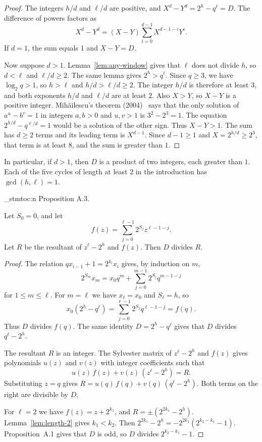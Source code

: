 \documentclass[11pt]{article}
\newenvironment{named}[1]{%
  \par\addvspace{\medskipamount}%
  \pagebreak[3]%
  \noindent{\bfseries #1}\space\ignorespaces
  \stmtoc{#1}%
}{\par\addvspace{\medskipamount}}
\newcommand{\stmtoc}[1]{ \qn_stmtoc:n {#1} }
\begin{document}
\begin{proof}
The integers $h/d$ and $\ell/d$ are positive, and $X^d - Y^d = 2^h - q^\ell = D$.
The difference of powers factors as
\[
X^d - Y^d = (X - Y) \sum_{i=0}^{d-1} X^{d-1-i} Y^i.
\]
If $d = 1$, the sum equals $1$ and $X - Y = D$.

Now suppose $d > 1$.
Lemma~\ref{lem:any-window} gives that $\ell$ does not divide $h$, so $d < \ell$ and $\ell/d \ge 2$.
The same lemma gives $2^h > q^\ell$.
Since $q \ge 3$, we have $\log_2 q > 1$, so $h > \ell$ and $h/d > \ell/d \ge 2$.
The integer $h/d$ is therefore at least $3$, and both exponents $h/d$ and $\ell/d$ are at least $2$.
Also $X > Y$, so $X - Y$ is a positive integer.
Mihăilescu's theorem (2004)~\cite{mihailescu} says that the only solution of $a^u - b^v = 1$ in integers $a, b > 0$ and $u, v > 1$ is $3^2 - 2^3 = 1$.
The equation $2^{h/d} - q^{\ell/d} = 1$ would be a solution of the other sign.
Thus $X - Y > 1$.
The sum has $d \ge 2$ terms and its leading term is $X^{d-1}$.
Since $d - 1 \ge 1$ and $X = 2^{h/d} \ge 2^3$, that term is at least $8$, and the sum is greater than $1$.
\end{proof}

In particular, if $d > 1$, then $D$ is a product of two integers, each greater than $1$.
Each of the five cycles of length at least $2$ in the introduction has $\gcd(h, \ell) = 1$.

\begin{named}{Proposition A.3.}
Let $S_0 = 0$, and let
\[
f(z) = \sum_{j=0}^{\ell-1} 2^{S_j} z^{\ell-1-j}.
\]
Let $R$ be the resultant of $z^\ell - 2^h$ and $f(z)$.
Then $D$ divides $R$.
\end{named}

\begin{proof}
The relation $q x_{i-1} + 1 = 2^{k_i} x_i$ gives, by induction on $m$,
\[
2^{S_m} x_m = x_0 q^m + \sum_{j=0}^{m-1} 2^{S_j} q^{m-1-j}
\]
for $1 \le m \le \ell$.
For $m = \ell$ we have $x_\ell = x_0$ and $S_\ell = h$, so
\[
x_0(2^h - q^\ell) = \sum_{j=0}^{\ell-1} 2^{S_j} q^{\ell-1-j} = f(q).
\]
Thus $D$ divides $f(q)$.
The same identity $D = 2^h - q^\ell$ gives that $D$ divides $q^\ell - 2^h$.

The resultant $R$ is an integer.
The Sylvester matrix of $z^\ell - 2^h$ and $f(z)$ gives polynomials $u(z)$ and $v(z)$ with integer coefficients such that
\[
u(z)\, f(z) + v(z)\,(z^\ell - 2^h) = R.
\]
Substituting $z = q$ gives $R = u(q)\, f(q) + v(q)\,(q^\ell - 2^h)$.
Both terms on the right are divisible by $D$.

For $\ell = 2$ we have $f(z) = z + 2^{k_1}$, and $R = \pm(2^{2k_1} - 2^h)$.
Lemma~\ref{lem:length-2} gives $k_1 < k_2$.
Then $2^{2k_1} - 2^h = -2^{2k_1}(2^{k_2 - k_1} - 1)$.
Proposition~A.1 gives that $D$ is odd, so $D$ divides $2^{k_2 - k_1} - 1$.
\end{proof}
\end{document}
